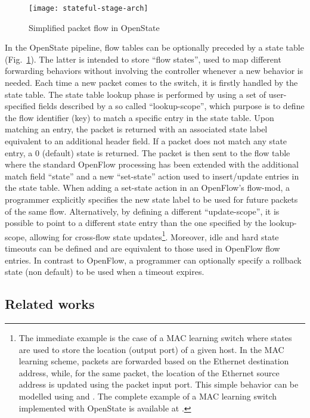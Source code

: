 \documentclass[10pt,conference]{IEEEtran}
\begin{document}
\begin{figure}
  \centering
  \texttt{[image: stateful-stage-arch]}
  \caption{Simplified packet flow in OpenState}
  \label{fig:os-stateful-stage}
  \vspace{-5mm}
\end{figure}

In the OpenState pipeline, flow tables can be optionally preceded by a state table (Fig.~\ref{fig:os-stateful-stage}). The latter is intended to store ``flow states'', used to map different forwarding behaviors without involving the controller whenever a new behavior is needed. Each time a new packet comes to the switch, it is firstly handled by the state table. The state table lookup phase is performed by using a set of user-specified fields described by a so called ``lookup-scope'', which purpose is to define the flow identifier (key) to match a specific entry in the state table. Upon matching an entry, the packet is returned with an associated state label equivalent to an additional header field. If a packet does not match any state entry, a 0 (default) state is returned. The packet is then sent to the flow table where the standard OpenFlow processing has been extended with the additional match field ``state'' and a new ``set-state'' action used to insert/update entries in the state table. When adding a set-state action in an OpenFlow's flow-mod, a programmer explicitly specifies the new state label to be used for future packets of the same flow. Alternatively, by defining a different ``update-scope'', it is possible to point to a different state entry than the one specified by the lookup-scope, allowing for cross-flow state updates\footnote{The immediate example is the case of a MAC learning switch where states are used to store the location (output port) of a given host. In the MAC learning scheme, packets are forwarded based on the Ethernet destination address, while, for the same packet, the location of the Ethernet source address is updated using the packet input port. This simple behavior can be modelled using  and . The complete example of a MAC learning switch implemented with OpenState is available at \cite{bianchi14}.}. Moreover, idle and hard state timeouts can be defined and are equivalent to those used in OpenFlow flow entries. In contrast to OpenFlow, a programmer can optionally specify a rollback state (non default) to be used when a timeout expires.

\subsection*{Related works}
\end{document}

